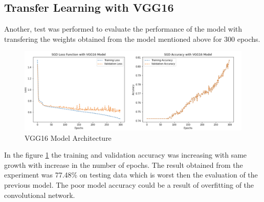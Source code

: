 \subsection{Transfer Learning with VGG16}
Another, test was performed to evaluate the performance of the model with transfering the
weights obtained from the model mentioned above for 300 epochs.

\begin{figure}[!htp]
    \centering
    \includegraphics[width=\textwidth]{Images/vgg162.png}
    \caption{VGG16 Model Architecture}
    \label{fig:vggRes2}
\end{figure}

In the figure \ref{fig:vggRes2} the training and validation accuracy 
was increasing with same growth with increase in the number of epochs.
The result obtained from the experiment was 77.48\% on testing data which is 
worst then the evaluation of the previous model. The poor model accuracy could be a result 
of overfitting of the convolutional network.
